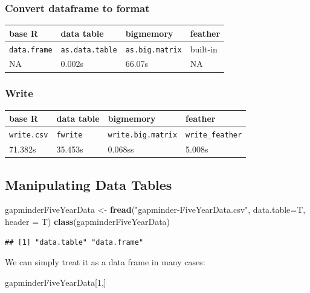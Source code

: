 \documentclass[]{article}
\newenvironment{Shaded}{\begin{snugshade}}{\end{snugshade}}
\newcommand{\KeywordTok}[1]{\textcolor[rgb]{0.13,0.29,0.53}{\textbf{{#1}}}}
\newcommand{\DataTypeTok}[1]{\textcolor[rgb]{0.13,0.29,0.53}{{#1}}}
\newcommand{\DecValTok}[1]{\textcolor[rgb]{0.00,0.00,0.81}{{#1}}}
\newcommand{\StringTok}[1]{\textcolor[rgb]{0.31,0.60,0.02}{{#1}}}
\newcommand{\NormalTok}[1]{{#1}}
\begin{document}
\subsubsection{Convert dataframe to
format}\label{convert-dataframe-to-format}

\begin{longtable}[c]{@{}llll@{}}
\toprule
\textbf{base R} & \textbf{data table} & \textbf{bigmemory} &
\textbf{feather}\tabularnewline
\midrule
\endhead
\texttt{data.frame} & \texttt{as.data.table} & \texttt{as.big.matrix} &
built-in\tabularnewline
NA & 0.002s & 66.07s & NA\tabularnewline
\bottomrule
\end{longtable}

\subsubsection{Write}\label{write}

\begin{longtable}[c]{@{}llll@{}}
\toprule
\textbf{base R} & \textbf{data table} & \textbf{bigmemory} &
\textbf{feather}\tabularnewline
\midrule
\endhead
\texttt{write.csv} & \texttt{fwrite} & \texttt{write.big.matrix} &
\texttt{write\_feather}\tabularnewline
71.382s & 35.453s & 0.068ss & 5.008s\tabularnewline
\bottomrule
\end{longtable}

\subsection{Manipulating Data Tables}\label{manipulating-data-tables}

\begin{Shaded}
\begin{Highlighting}[]
\NormalTok{gapminderFiveYearData <-}\StringTok{ }\KeywordTok{fread}\NormalTok{(}\StringTok{"gapminder-FiveYearData.csv"}\NormalTok{, }\DataTypeTok{data.table=}\NormalTok{T, }\DataTypeTok{header =} \NormalTok{T)}
\KeywordTok{class}\NormalTok{(gapminderFiveYearData)}
\end{Highlighting}
\end{Shaded}

\begin{verbatim}
## [1] "data.table" "data.frame"
\end{verbatim}

We can simply treat it as a data frame in many cases:

\begin{Shaded}
\begin{Highlighting}[]
\NormalTok{gapminderFiveYearData[}\DecValTok{1}\NormalTok{,]}
\end{Highlighting}
\end{Shaded}
\end{document}
